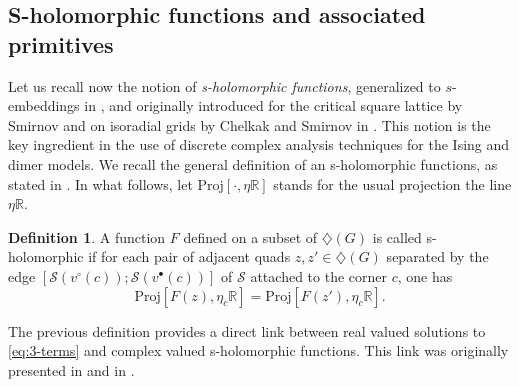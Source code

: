 \documentclass[reqno]{amsart}
\numberwithin{equation}{section}
\theoremstyle{definition}
\newtheorem{definition}[theo]{Definition}
\theoremstyle{remark}
\newcommand\R{\mathbb{R}}
\newcommand\cS{\mathcal{S}}
\newcommand\Dm{\diamondsuit}
\begin{document}
\subsection{S-holomorphic functions and associated primitives}\label{sub:HF-def}
Let us recall now the notion of \emph{s-holomorphic functions}, generalized to $s$-embeddings in \cite{Che20}, and originally introduced for the critical square lattice by Smirnov \cite[Definition 3.1]{Smirnov_Ising} and on isoradial grids by Chelkak and Smirnov in \cite[Definition~3.1]{ChSmi2}. This notion is the key ingredient in the use of discrete complex analysis techniques for the Ising and dimer models. We recall the general definition of an s-holomorphic functions, as stated in \cite[Definition 2.4]{Che20}. In what follows, let $\textrm{Proj}[\cdot,\eta \R]$ stands for the usual projection the line $\eta \R$.

\begin{definition}\label{def:s-hol}
A function $F$ defined on a subset of $\Dm(G)$ is called s-holomorphic if for each pair of adjacent quads $z,z'\in\Dm(G)$ separated by the edge $[\cS(v^\circ(c));\cS(v^\bullet(c))]$ of $\cS$ attached to the corner $c$, one has
\begin{equation}
\label{eq:s-hol}
\textrm{Proj}[F(z),\eta_c\R] = \textrm{Proj}[F(z'),\eta_c\R].
\end{equation}
\end{definition}
The previous definition provides a direct link between real valued solutions to \eqref{eq:3-terms} and complex valued s-holomorphic functions. This link was originally presented in \cite[Proposition 2.5]{Che20} and in \cite[Appendix]{CLR1}.
\end{document}
